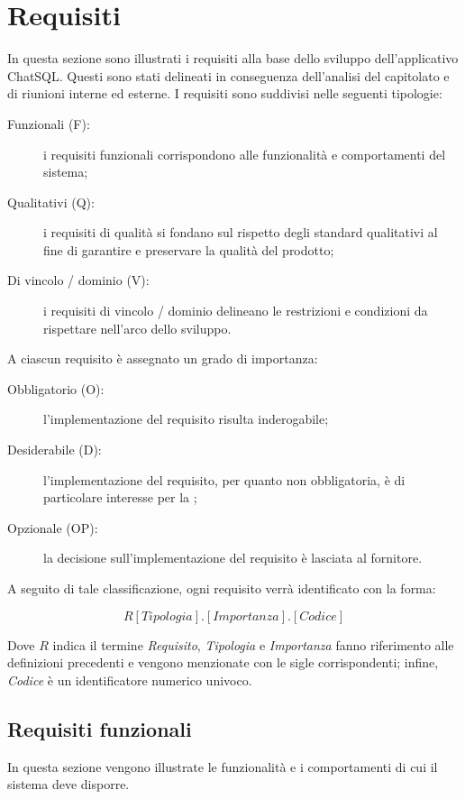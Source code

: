 \section{Requisiti}
\par In questa sezione sono illustrati i requisiti alla base dello sviluppo dell'applicativo ChatSQL. Questi sono stati delineati in conseguenza dell'analisi del capitolato e di riunioni interne ed esterne. I requisiti sono suddivisi nelle seguenti tipologie:
\begin{description}
  \item[Funzionali (F):] i requisiti funzionali corrispondono alle funzionalità  e comportamenti del sistema;
  \item[Qualitativi (Q):] i requisiti di qualità si fondano sul rispetto degli standard qualitativi al fine di garantire e preservare la qualità del prodotto;
  \item[Di vincolo / dominio (V):] i requisiti di vincolo / dominio delineano le restrizioni e condizioni da rispettare nell'arco dello sviluppo.
\end{description}
\par A ciascun requisito è assegnato un grado di importanza:
\begin{description}
  \item[Obbligatorio (O):] l'implementazione del requisito risulta inderogabile;
  \item[Desiderabile (D):] l'implementazione del requisito, per quanto non obbligatoria, è di particolare interesse per la ;
  \item[Opzionale (OP):] la decisione sull'implementazione del requisito è lasciata al fornitore.
\end{description}
\par A seguito di tale classificazione, ogni requisito verrà identificato con la forma:
\par \textbf{\[R[Tipologia].[Importanza].[Codice]\]}
\par Dove \textbf{\(R\)} indica il termine \emph{Requisito}, \emph{Tipologia} e \emph{Importanza} fanno riferimento alle definizioni precedenti e vengono menzionate con le sigle corrispondenti; infine, \emph{Codice} è un identificatore numerico univoco.

\subsection{Requisiti funzionali}
\par In questa sezione vengono illustrate le funzionalità e i comportamenti di cui il sistema deve disporre.

